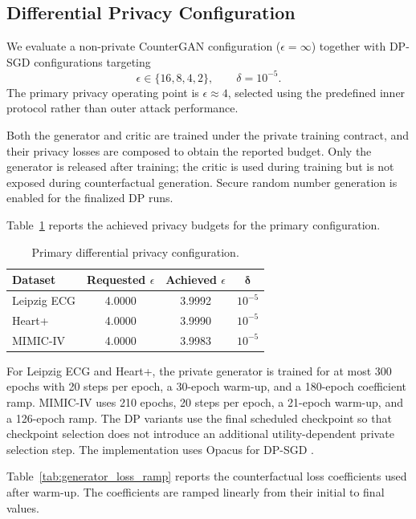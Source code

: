 \documentclass[preprint,12pt]{elsarticle}
\begin{document}
\subsection{Differential Privacy Configuration}
\label{subsec:dp_setting}

We evaluate a non-private CounterGAN configuration
($\epsilon=\infty$) together with DP-SGD configurations targeting
\[
\epsilon\in\{16,8,4,2\},
\qquad
\delta=10^{-5}.
\]
The primary privacy operating point is $\epsilon\approx4$, selected using the
predefined inner protocol rather than outer attack performance.

Both the generator and critic are trained under the private training contract,
and their privacy losses are composed to obtain the reported budget. Only the
generator is released after training; the critic is used during training but is
not exposed during counterfactual generation. Secure random number generation
is enabled for the finalized DP runs.

Table~\ref{tab:dp_primary} reports the achieved privacy budgets for the primary
configuration.

\begin{table}[t]
\centering
\caption{Primary differential privacy configuration.}
\label{tab:dp_primary}
\begin{tabular}{lccc}
\toprule
\textbf{Dataset}
& \textbf{Requested $\epsilon$}
& \textbf{Achieved $\epsilon$}
& $\boldsymbol{\delta}$ \\
\midrule
Leipzig ECG & 4.0000 & 3.9992 & $10^{-5}$ \\
Heart+      & 4.0000 & 3.9990 & $10^{-5}$ \\
MIMIC-IV    & 4.0000 & 3.9983 & $10^{-5}$ \\
\bottomrule
\end{tabular}
\end{table}

For Leipzig ECG and Heart+, the private generator is trained for at most 300
epochs with 20 steps per epoch, a 30-epoch warm-up, and a 180-epoch coefficient
ramp. MIMIC-IV uses 210 epochs, 20 steps per epoch, a 21-epoch warm-up, and a
126-epoch ramp. The DP variants use the final scheduled checkpoint so that
checkpoint selection does not introduce an additional utility-dependent private
selection step. The implementation uses Opacus for DP-SGD
\cite{yousefpour2021opacus}.

Table~\ref{tab:generator_loss_ramp} reports the counterfactual loss
coefficients used after warm-up. The coefficients are ramped linearly from
their initial to final values.
\end{document}
